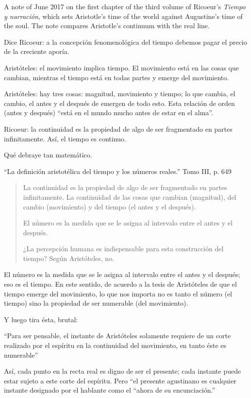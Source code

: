 A note of June 2017 on the first chapter of
the third volume of Ricoeur's \emph{Tiempo
y narración}, which sets Aristotle's time
of the world against Augustine's time of
the soul. The note compares Aristotle's
continuum with the real line.

Dice Ricoeur: a la concepción fenomenológica
del tiempo debemos pagar el precio de la
creciente aporía.

Aristóteles: el movimiento implica tiempo. El
movimiento está en las cosas que cambian,
mientras el tiempo está en todas partes y
emerge del movimiento.

Aristóteles: hay tres cosas: magnitud,
movimiento y tiempo; lo que cambia, el
cambio, el antes y el después de emergen de
todo esto. Esta relación de orden (antes y
después) ``está en el mundo mucho antes de
estar en el alma''.

Ricoeur: la continuidad es la propiedad de
algo de ser fragmentado en partes
infinitamente. Así, el tiempo es continuo.

Qué debraye tan matemático.

``La definición aristotélica del tiempo y los
números reales.'' Tomo III, p. 649

\begin{quote}
La continuidad es la propiedad de algo de ser
fragmentado en partes infinitamente. La
continuidad de las cosas que cambian
(magnitud), del cambio (movimiento) y del
tiempo (el antes y el después).

El número es la medida que se le asigna al
intervalo entre el antes y el después.

¿La percepción humana es indispensable para
esta construcción del tiempo? Según
Aristóteles, no.
\end{quote}

El número es la medida que se le asigna al
intervalo entre el antes y el después; eso es
el tiempo. En este sentido, de acuerdo a la
tesis de Aristóteles de que el tiempo emerge
del movimiento, lo que nos importa no es
tanto el número (el tiempo) sino la propiedad
de ser numerable (del movimiento).

Y luego tira ésta, brutal:

``Para ser pensable, el instante de
Aristóteles solamente requiere de un corte
realizado por el espíritu en la continuidad
del movimiento, en tanto éste es numerable''

Así, cada punto en la recta real es digno de
ser el presente; cada instante puede estar
sujeto a este corte del espíritu. Pero ``el
presente agustinano es cualquier instante
designado por el hablante como el ``ahora de
su encunciación.''

